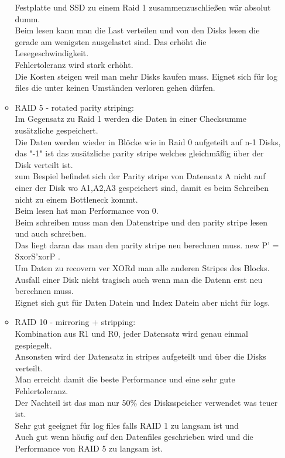 \documentclass[12pt]{article}\pagestyle{myheadings}
\theoremstyle{plain}
\begin{document}
\begin{enumerate}
\begin{itemize}
Festplatte und SSD zu einem Raid 1 zusammenzuschließen wär absolut dumm.\\
Beim lesen kann man die Last verteilen und von den Disks lesen die gerade am wenigsten ausgelastet sind. Das erhöht die Lesegeschwindigkeit.\\
Fehlertoleranz wird stark erhöht.\\
Die Kosten steigen weil man mehr Disks kaufen muss.
Eignet sich für log files die unter keinen Umständen verloren gehen dürfen.\\
\item RAID 5 - rotated parity striping:\\
Im Gegensatz zu Raid 1 werden die Daten in einer Checksumme zusätzliche gespeichert.\\
Die Daten werden wieder in Blöcke wie in Raid 0 aufgeteilt auf n-1 Disks, das "-1" ist das zusätzliche parity stripe welches gleichmäßig über der Disk verteilt ist.\\
zum Bespiel befindet sich der Parity stripe von Datensatz A nicht auf einer der Disk wo A1,A2,A3 gespeichert sind, damit es beim Schreiben nicht zu einem Bottleneck kommt.\\
Beim lesen hat man Performance von 0.\\
Beim schreiben muss man den Datenstripe und den parity stripe lesen und auch schreiben.\\
Das liegt daran das man den parity stripe neu berechnen muss. new P' = SxorS'xorP .\\
Um Daten zu recovern ver XORd man alle anderen Stripes des Blocks.\\
Ausfall einer Disk nicht tragisch auch wenn man die Datenn erst neu berechnen muss.\\
Eignet sich gut für Daten Datein und Index Datein aber nicht für logs.\\
\item RAID 10 - mirroring + stripping:\\
Kombination aus R1 und R0, jeder Datensatz wird genau einmal gespiegelt.\\Ansonsten wird der Datensatz in stripes aufgeteilt und über die Disks verteilt.\\
Man erreicht damit die beste Performance und eine sehr gute Fehlertoleranz.\\
Der Nachteil ist das man nur 50\% des Disksspeicher verwendet was teuer ist.\\
Sehr gut geeignet für log files falls RAID 1 zu langsam ist und \\
Auch gut wenn häufig auf den Datenfiles geschrieben wird und die Performance von RAID 5 zu langsam ist. 


\end{itemize}
\end{enumerate}
\end{document}
